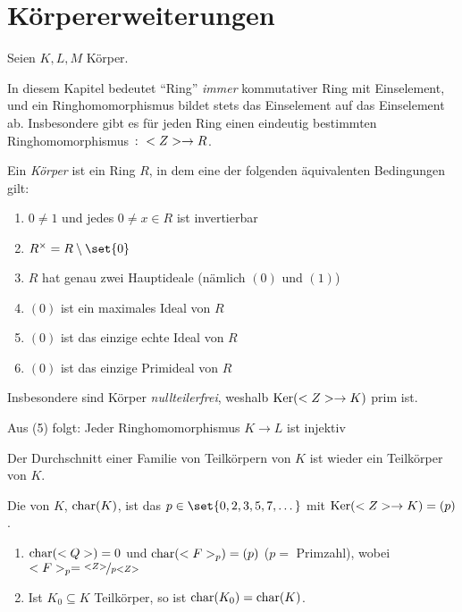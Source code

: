 \section{Körpererweiterungen}

Seien $K,L,M$ Körper.

\begin{remark}
	In diesem Kapitel bedeutet ``Ring'' \emph{immer} kommutativer Ring mit Einselement, und ein Ringhomomorphismus bildet stets das Einselement auf das Einselement ab.
	Insbesondere gibt es für jeden Ring einen eindeutig bestimmten Ringhomomorphismus $\colon <Z> \to R$.
\end{remark}

\begin{remark}
	\begin{remarkenum}[]
		\item Ein \emph{Körper} ist ein Ring $R$, in dem eine der folgenden äquivalenten Bedingungen gilt:
		\begin{enumerate}[label=\arabic*)]
			\item $0 \neq 1$ und jedes $0 \neq x \in R$ ist invertierbar
			\item $R^{\times} = R \setminus \set{0}$
			\item $R$ hat genau zwei Hauptideale (nämlich $(0)$ und $(1)$)
			\item $(0)$ ist ein maximales Ideal von $R$
			\item $(0)$ ist das einzige echte Ideal von $R$
			\item $(0)$ ist das einzige Primideal von $R$
		\end{enumerate}
		\item Insbesondere sind Körper \emph{nullteilerfrei}, weshalb $\operatorname{Ker}(<Z> \to K)$ prim ist.
		\item Aus (5) folgt: Jeder Ringhomomorphismus $K \to L$ ist injektiv %
		\item {} Der Durchschnitt einer Familie von Teilkörpern von $K$ ist wieder ein Teilkörper von $K$.
	\end{remarkenum}
\end{remark}

\begin{definition}[Charakteristik]
	Die  von $K$, $\operatorname{char}(K)$, ist das $p \in \set{0,2,3,5,7, \dots}$ mit $\operatorname{Ker}(<Z> \to K) = (p)$.
\end{definition}

\begin{example}
	\begin{enumerate}[label=(\alph*)]
		\item $\operatorname{char}(<Q>) = 0$ und $\operatorname{char}(<F>_p) = (p)$ ($p =$ Primzahl), wobei $\Fp = \lnkset{\Z}{p\Z}$
		\item Ist $K_0 \subseteq K$ Teilkörper, so ist $\operatorname{char}(K_0) = \operatorname{char}(K)$.
	\end{enumerate}
\end{example}

